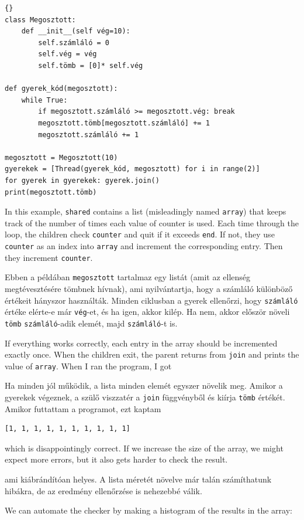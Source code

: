 \documentclass{book}
\begin{document}
\begin{lstlisting}[title={Kökiz ellenőrzés probléma}]{}
class Megosztott:
    def __init__(self vég=10):
        self.számláló = 0
        self.vég = vég
        self.tömb = [0]* self.vég

def gyerek_kód(megosztott):
    while True:
        if megosztott.számláló >= megosztott.vég: break
        megosztott.tömb[megosztott.számláló] += 1
        megosztott.számláló += 1

megosztott = Megosztott(10)
gyerekek = [Thread(gyerek_kód, megosztott) for i in range(2)]
for gyerek in gyerekek: gyerek.join()
print(megosztott.tömb)
\end{lstlisting}

In this example, {\tt shared} contains a list (misleadingly
named {\tt array}) that keeps track of the number of times
each value of counter is used.
Each time through the loop, the children check {\tt counter}
and quit if it exceeds {\tt end}.  If not, they use {\tt counter}
as an index into {\tt array} and increment the corresponding
entry.  Then they increment {\tt counter}.

Ebben a példában {\tt megosztott} tartalmaz egy listát (amit az
ellenség megtévesztésére tömbnek hívnak), ami nyilvántartja, hogy
a számláló különböző értékeit hányszor használták.
Minden ciklusban a gyerek ellenőrzi, hogy {\tt számláló} értéke
elérte-e már {\tt vég}-et, és ha igen, akkor kilép. Ha nem,
akkor először növeli {\tt tömb} {\tt számláló}-adik elemét,
majd {\tt számláló}-t is.

If everything works correctly, each entry in the array should
be incremented exactly once.  When the children exit, the parent
returns from {\tt join} and prints the value of {\tt array}.
When I ran the program, I got

Ha minden jól működik, a lista minden elemét egyszer növelik meg.
Amikor a gyerekek végeznek, a szülő viszzatér a {\tt join} függvényből
és kiírja {\tt tömb} értékét.
Amikor futtattam a programot, ezt kaptam
%
\begin{verbatim}
[1, 1, 1, 1, 1, 1, 1, 1, 1, 1]
\end{verbatim}
%
which is disappointingly correct.  If we increase the size of
the array, we might expect more errors, but it also gets harder
to check the result.

ami kiábrándítóan helyes. A lista méretét növelve már talán
számíthatunk hibákra, de az eredmény ellenőrzése is nehezebbé válik.

\newpage
We can automate the checker by making
a histogram of the results in the array:
\end{document}
